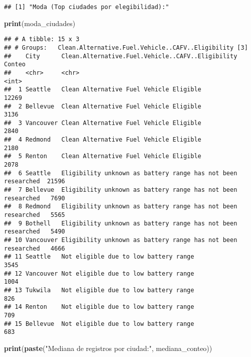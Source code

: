 \documentclass[
]{article}
\newenvironment{Shaded}{\begin{snugshade}}{\end{snugshade}}
\newcommand{\FunctionTok}[1]{\textcolor[rgb]{0.13,0.29,0.53}{\textbf{#1}}}
\newcommand{\NormalTok}[1]{#1}
\newcommand{\StringTok}[1]{\textcolor[rgb]{0.31,0.60,0.02}{#1}}
\begin{document}
\begin{verbatim}
## [1] "Moda (Top ciudades por elegibilidad):"
\end{verbatim}

\begin{Shaded}
\begin{Highlighting}[]
\FunctionTok{print}\NormalTok{(moda\_ciudades)}
\end{Highlighting}
\end{Shaded}

\begin{verbatim}
## # A tibble: 15 x 3
## # Groups:   Clean.Alternative.Fuel.Vehicle..CAFV..Eligibility [3]
##    City      Clean.Alternative.Fuel.Vehicle..CAFV..Eligibility            Conteo
##    <chr>     <chr>                                                         <int>
##  1 Seattle   Clean Alternative Fuel Vehicle Eligible                       12269
##  2 Bellevue  Clean Alternative Fuel Vehicle Eligible                        3136
##  3 Vancouver Clean Alternative Fuel Vehicle Eligible                        2840
##  4 Redmond   Clean Alternative Fuel Vehicle Eligible                        2180
##  5 Renton    Clean Alternative Fuel Vehicle Eligible                        2078
##  6 Seattle   Eligibility unknown as battery range has not been researched  21596
##  7 Bellevue  Eligibility unknown as battery range has not been researched   7690
##  8 Redmond   Eligibility unknown as battery range has not been researched   5565
##  9 Bothell   Eligibility unknown as battery range has not been researched   5490
## 10 Vancouver Eligibility unknown as battery range has not been researched   4666
## 11 Seattle   Not eligible due to low battery range                          3545
## 12 Vancouver Not eligible due to low battery range                          1004
## 13 Tukwila   Not eligible due to low battery range                           826
## 14 Renton    Not eligible due to low battery range                           709
## 15 Bellevue  Not eligible due to low battery range                           683
\end{verbatim}

\begin{Shaded}
\begin{Highlighting}[]
\FunctionTok{print}\NormalTok{(}\FunctionTok{paste}\NormalTok{(}\StringTok{"Mediana de registros por ciudad:"}\NormalTok{, mediana\_conteo))}
\end{Highlighting}
\end{Shaded}
\end{document}
